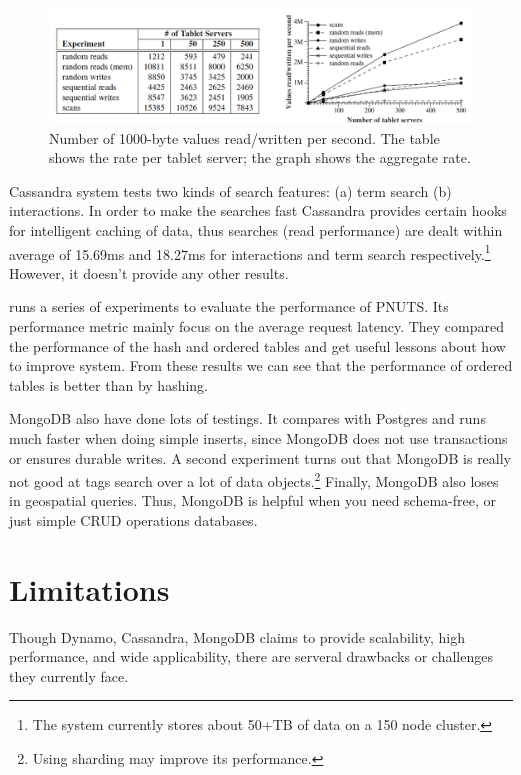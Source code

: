 \documentclass[letter,twocolumn]{article}
\begin{document}
\begin{figure}[htbp]
\centering
\includegraphics[width=\textwidth]{fig/bigtable}
\caption{Number of 1000-byte values read/written per second. The table shows the rate per tablet server; the graph shows the aggregate rate.}
\label{fig:bigtable}
\end{figure}


Cassandra system tests two kinds of search features: (a) term search (b) interactions.\citep{LakshamAvinash2010} In order to make the searches fast Cassandra provides certain hooks for intelligent caching of data, thus searches (read performance) are dealt within average of 15.69ms and 18.27ms for interactions and term search respectively.\footnote{The system currently stores about 50+TB of data on a 150 node cluster.} However, it doesn't provide any other results.

\citep{Silberstein2008} runs a series of experiments to evaluate the performance of PNUTS. Its performance metric mainly focus on the average request latency. They compared the performance of the hash and ordered tables and get useful lessons about how to improve system. From these results we can see that the performance of ordered tables is better than by hashing.

MongoDB also have done lots of testings. It compares with Postgres and runs much faster when doing simple inserts, since MongoDB does not use transactions or ensures durable writes. A second experiment turns out that MongoDB is really not good at tags search over a lot of data objects.\footnote{Using sharding may improve its performance.} Finally, MongoDB also loses in geospatial queries. Thus, MongoDB is helpful when you need schema-free, or just simple CRUD operations databases.

\section{Limitations}
Though Dynamo, Cassandra, MongoDB claims to provide scalability, high performance, and wide applicability, there are serveral drawbacks or challenges they currently face.
\end{document}
